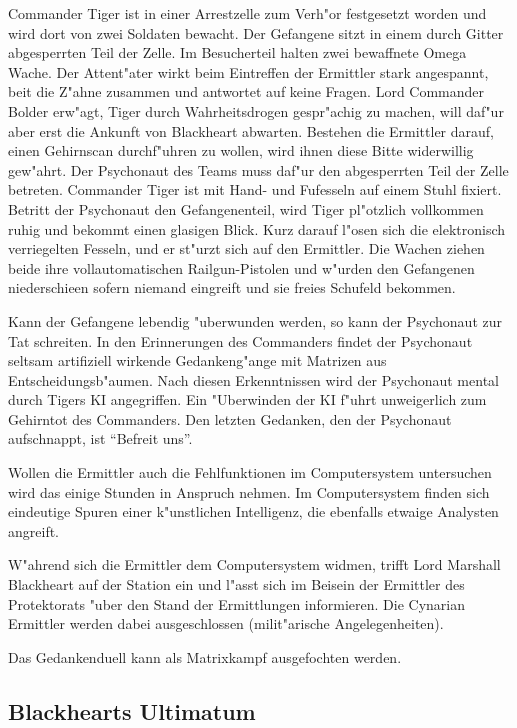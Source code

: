 Commander Tiger ist in einer Arrestzelle zum Verh"or festgesetzt worden und wird dort von zwei Soldaten bewacht. Der Gefangene sitzt in einem durch Gitter abgesperrten Teil der Zelle. Im Besucherteil halten zwei bewaffnete Omega Wache. Der Attent"ater wirkt beim Eintreffen der Ermittler stark angespannt, bei\3t die Z"ahne zusammen und antwortet auf keine Fragen. Lord Commander Bolder erw"agt, Tiger durch Wahrheitsdrogen gespr"achig zu machen, will daf"ur aber erst die Ankunft von Blackheart abwarten. Bestehen die Ermittler darauf, einen Gehirnscan durchf"uhren zu wollen, wird ihnen diese Bitte widerwillig gew"ahrt. Der Psychonaut des Teams muss daf"ur den abgesperrten Teil der Zelle betreten. Commander Tiger ist mit Hand- und Fu\3fesseln auf einem Stuhl fixiert. Betritt der Psychonaut den Gefangenenteil, wird Tiger pl"otzlich vollkommen ruhig und bekommt einen glasigen Blick. Kurz darauf l"osen sich die elektronisch verriegelten Fesseln, und er st"urzt sich auf den Ermittler. Die Wachen ziehen beide ihre vollautomatischen Railgun-Pistolen und w"urden den Gefangenen niederschie\3en sofern niemand eingreift und sie freies Schu\3feld bekommen.

Kann der Gefangene lebendig "uberwunden werden, so kann der Psychonaut zur Tat schreiten. In den Erinnerungen des Commanders findet der Psychonaut seltsam artifiziell wirkende Gedankeng"ange mit Matrizen aus Entscheidungsb"aumen. Nach diesen Erkenntnissen wird der Psychonaut mental durch Tigers KI angegriffen. Ein "Uberwinden der KI f"uhrt unweigerlich zum Gehirntot des Commanders. Den letzten Gedanken, den der Psychonaut aufschnappt, ist "`Befreit uns"'.

Wollen die Ermittler auch die Fehlfunktionen im Computersystem untersuchen wird das einige Stunden in Anspruch nehmen. Im Computersystem finden sich eindeutige Spuren einer k"unstlichen Intelligenz, die ebenfalls etwaige Analysten angreift.

W"ahrend sich die Ermittler dem Computersystem widmen, trifft Lord Marshall Blackheart auf der Station ein und l"asst sich im Beisein der Ermittler des Protektorats "uber den Stand der Ermittlungen informieren. Die Cynarian Ermittler werden dabei ausgeschlossen (milit"arische Angelegenheiten).

\begin{remarks}
	Das Gedankenduell kann als Matrixkampf ausgefochten werden.
\end{remarks}

\subsection{Blackhearts Ultimatum}

